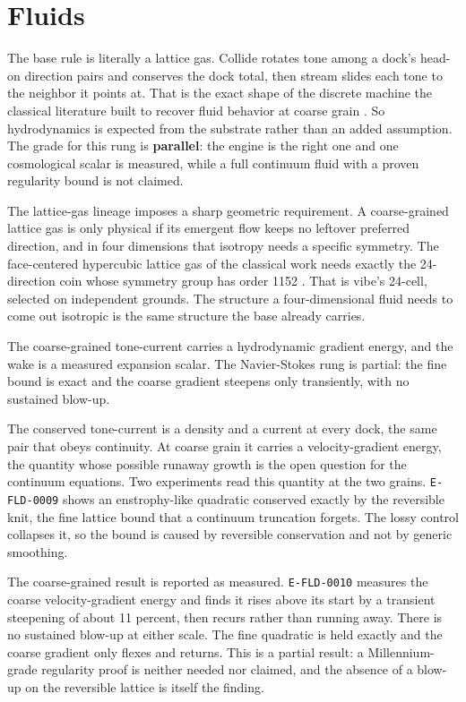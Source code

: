\section{Fluids}

The base rule is literally a lattice gas. Collide rotates tone among a dock's head-on direction pairs and conserves the dock total, then stream slides each tone to the neighbor it points at. That is the exact shape of the discrete machine the classical literature built to recover fluid behavior at coarse grain \cite{frisch1986}. So hydrodynamics is expected from the substrate rather than an added assumption. The grade for this rung is \textbf{parallel}: the engine is the right one and one cosmological scalar is measured, while a full continuum fluid with a proven regularity bound is not claimed.

The lattice-gas lineage imposes a sharp geometric requirement. A coarse-grained lattice gas is only physical if its emergent flow keeps no leftover preferred direction, and in four dimensions that isotropy needs a specific symmetry. The face-centered hypercubic lattice gas of the classical work needs exactly the 24-direction coin whose symmetry group has order 1152 \cite{dhumieres1986}. That is vibe's 24-cell, selected on independent grounds. The structure a four-dimensional fluid needs to come out isotropic is the same structure the base already carries.

\begin{finding}
The coarse-grained tone-current carries a hydrodynamic gradient energy, and the wake is a measured expansion scalar. The Navier-Stokes rung is partial: the fine bound is exact and the coarse gradient steepens only transiently, with no sustained blow-up.
\end{finding}

The conserved tone-current is a density and a current at every dock, the same pair that obeys continuity. At coarse grain it carries a velocity-gradient energy, the quantity whose possible runaway growth is the open question for the continuum equations. Two experiments read this quantity at the two grains. \texttt{E-FLD-0009} shows an enstrophy-like quadratic conserved exactly by the reversible knit, the fine lattice bound that a continuum truncation forgets. The lossy control collapses it, so the bound is caused by reversible conservation and not by generic smoothing.

The coarse-grained result is reported as measured. \texttt{E-FLD-0010} measures the coarse velocity-gradient energy and finds it rises above its start by a transient steepening of about 11 percent, then recurs rather than running away. There is no sustained blow-up at either scale. The fine quadratic is held exactly and the coarse gradient only flexes and returns. This is a partial result: a Millennium-grade regularity proof is neither needed nor claimed, and the absence of a blow-up on the reversible lattice is itself the finding.

